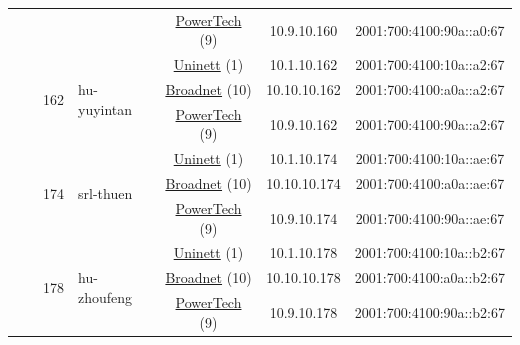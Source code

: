 \begin{small}
\begin{center}
\begin{longtable}{|c|c|c|c|c|c|c|c|}
  &  &  &  & \multicolumn{2}{|c|}{\tiny{\href{http://www.powertech.no}{PowerTech} (9)}} & \tiny{10.9.10.160} & \tiny{2001:700:4100:90a::a0:67} \\* \cline{3-3}\cline{4-4}\cline{5-5}\cline{6-6}\cline{7-7}\cline{8-8}
  &  & \multirow{3}{*}{\tiny{162}} & \multicolumn{1}{|l|}{\multirow{3}{*}{\tiny{hu-yuyintan}}} & \multicolumn{2}{|c|}{\tiny{\href{https://www.uninett.no}{Uninett} (1)}} & \tiny{10.1.10.162} & \tiny{2001:700:4100:10a::a2:67} \\* \cline{5-5}\cline{6-6}\cline{7-7}\cline{8-8}
  &  &  &  & \multicolumn{2}{|c|}{\tiny{\href{https://www.broadnet.no}{Broadnet} (10)}} & \tiny{10.10.10.162} & \tiny{2001:700:4100:a0a::a2:67} \\* \cline{5-5}\cline{6-6}\cline{7-7}\cline{8-8}
  &  &  &  & \multicolumn{2}{|c|}{\tiny{\href{http://www.powertech.no}{PowerTech} (9)}} & \tiny{10.9.10.162} & \tiny{2001:700:4100:90a::a2:67} \\* \cline{3-3}\cline{4-4}\cline{5-5}\cline{6-6}\cline{7-7}\cline{8-8}
  &  & \multirow{3}{*}{\tiny{174}} & \multicolumn{1}{|l|}{\multirow{3}{*}{\tiny{srl-thuen}}} & \multicolumn{2}{|c|}{\tiny{\href{https://www.uninett.no}{Uninett} (1)}} & \tiny{10.1.10.174} & \tiny{2001:700:4100:10a::ae:67} \\* \cline{5-5}\cline{6-6}\cline{7-7}\cline{8-8}
  &  &  &  & \multicolumn{2}{|c|}{\tiny{\href{https://www.broadnet.no}{Broadnet} (10)}} & \tiny{10.10.10.174} & \tiny{2001:700:4100:a0a::ae:67} \\* \cline{5-5}\cline{6-6}\cline{7-7}\cline{8-8}
  &  &  &  & \multicolumn{2}{|c|}{\tiny{\href{http://www.powertech.no}{PowerTech} (9)}} & \tiny{10.9.10.174} & \tiny{2001:700:4100:90a::ae:67} \\* \cline{3-3}\cline{4-4}\cline{5-5}\cline{6-6}\cline{7-7}\cline{8-8}
  &  & \multirow{3}{*}{\tiny{178}} & \multicolumn{1}{|l|}{\multirow{3}{*}{\tiny{hu-zhoufeng}}} & \multicolumn{2}{|c|}{\tiny{\href{https://www.uninett.no}{Uninett} (1)}} & \tiny{10.1.10.178} & \tiny{2001:700:4100:10a::b2:67} \\* \cline{5-5}\cline{6-6}\cline{7-7}\cline{8-8}
  &  &  &  & \multicolumn{2}{|c|}{\tiny{\href{https://www.broadnet.no}{Broadnet} (10)}} & \tiny{10.10.10.178} & \tiny{2001:700:4100:a0a::b2:67} \\* \cline{5-5}\cline{6-6}\cline{7-7}\cline{8-8}
  &  &  &  & \multicolumn{2}{|c|}{\tiny{\href{http://www.powertech.no}{PowerTech} (9)}} & \tiny{10.9.10.178} & \tiny{2001:700:4100:90a::b2:67} \\* \cline{3-3}\cline{4-4}\cline{5-5}\cline{6-6}\cline{7-7}\cline{8-8}

\end{longtable}
\end{center}
\end{small}
